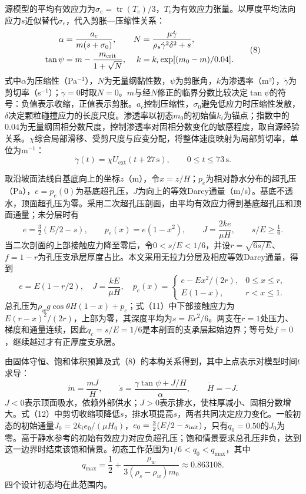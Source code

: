 \documentclass[withoutpreface]{cumcmthesis}
\providecommand{\heiti}{\CJKfamily{zhhei}}
\newcommand{\topic}[1]{{\heiti\bfseries\fontsize{11}{14}\selectfont #1}}
\begin{document}
源模型的平均有效应力为$\sigma_e=\operatorname{tr}(T_e)/3$，$T_e$为有效应力张量。以厚度平均法向应力$s$近似替代$\sigma_e$，代入剪胀—压缩性关系\cite{q2iverson14}：
\[
\begin{aligned}
\alpha&=\frac{a_c}{m(s+\sigma_0)},&
N&=\frac{\mu\dot\gamma}{\rho_s\dot\gamma^2\delta^2+s},\\
\tan\psi&=m-\frac{m_{\rm crit}}{1+\sqrt N},&
k&=k_i\exp[(m_0-m)/0.04].
\end{aligned} \tag{8}
\]
式中$\alpha$为压缩性（Pa$^{-1}$），$N$为无量纲黏性数，$\psi$为剪胀角，$k$为渗透率（m²），$\dot\gamma$为剪切率（s$^{-1}$）；$\dot\gamma=0$时取$N=0$。$m$与经$N$修正的临界分数比较决定$\tan\psi$的符号：负值表示收缩，正值表示剪胀。$a_c$控制压缩性，$\sigma_0$避免低应力时压缩性发散，$\delta$决定颗粒碰撞应力的长度尺度。渗透率以初态$m_0$的初始值$k_i$为锚点；指数中的0.04为无量纲固相分数尺度，控制渗透率对固相分数变化的敏感程度，取自源经验关系\cite{q2iverson14}。$\chi$综合局部滑移、受剪尺度与应变分配，将整体速度映射为局部剪切率，单位为m$^{-1}$：
\[
\dot\gamma(t)=\chi U_{\mathrm{ext}}(t+27\,\mathrm{s}),\qquad 0\le t\le73\,\mathrm{s}. \tag{9}
\]

\noindent\hspace*{2em}\topic{无拉力分层与水量平衡}

取沿坡面法线自基底向上的坐标$z$（m），令$x=z/H$；$p_e$为相对静水分布的超孔压（Pa），$e=p_e(0)$为基底超孔压，$J$为向上的等效Darcy通量（m/s）。基底不透水，顶面超孔压为零。采用二次超孔压剖面\cite{q2iverson14}，由平均有效应力得到基底超孔压和顶面通量；未分层时有
\[
e=\tfrac32(E/2-s),\qquad p_e(x)=e(1-x^2),\qquad J=\frac{2ke}{\mu H},\qquad s/E\ge\tfrac16. \tag{10}
\]
当二次剖面的上部接触应力降至零后，令$0<s/E<1/6$，并设$r=\sqrt{6s/E}$、$f=1-r$为孔压支承层厚度占比。本文采用无拉力分层及相应等效Darcy通量，得到
\[
e=E(1-r/2),\quad J=\frac{kE}{\mu H},\quad
p_e(x)=\begin{cases}e-Ex^2/(2r),&0\le x\le r,\\E(1-x),&r<x\le1.\end{cases} \tag{11}
\]
总孔压为$\rho_wg\cos\theta H(1-x)+p_e$；式（11）中下部接触应力为$E(r-x)^2/(2r)$，上部为零，其深度平均为$s=Er^2/6$。两支在$r=1$处压力、梯度和通量连续，因此$q_c=s/E=1/6$是本剖面的支承层起始边界；等号处$f=0$，继续越过才有正厚度支承层。

由固体守恒、饱和体积预算及式（8）的本构关系得到，其中上点表示对模型时间$t$求导：
\[
\dot m=\frac{mJ}{H},\qquad
\dot s=\frac{\dot\gamma\tan\psi+J/H}{\alpha},\qquad
\dot H=-J. \tag{12}
\]
$J<0$表示顶面吸水，依赖外部供水；$J>0$表示排水，使柱厚减小、固相分数增大。式（12）中剪切收缩项降低$s$，排水项提高$s$，两者共同决定应力变化。一般初态的初始通量$J_0=2k_i e_0/(\mu H_0)$，$e_0=\frac32(E/2-s_{\rm init})$，只有$q_0=0.50$的$J_0$为零。高于静水参考的初始有效应力对应负超孔压；饱和情景要求总孔压非负，达到这一边界时结束该饱和情景。初态工作范围为$1/6<q_0<q_{\max}$，其中
\[
q_{\max}=\frac12+\frac{\rho_w}{3(\rho_s-\rho_w)m_0}\approx0.863108. \tag{13}
\]
四个设计初态均在此范围内。
\end{document}
